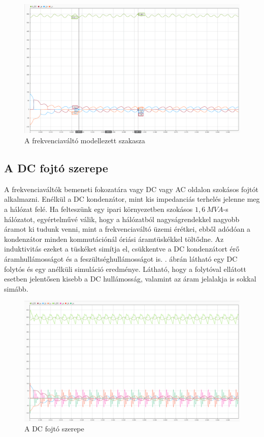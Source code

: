 \begin{figure}[H]
	\centering
	\includegraphics[width = \textwidth]{figures/continous_testrun_1.png}
	\caption{A frekvenciaváltó modellezett szakasza} 
	\label{fig:cont_run}
\end{figure}

\subsection{A DC fojtó szerepe}

A frekvenciaváltók bemeneti fokozatára vagy DC vagy AC oldalon szokásos fojtót alkalmazni. Enélkül a DC kondenzátor, mint kis impedanciás terhelés jelenne meg a hálózat felé. Ha felteszünk egy ipari környezetben szokásos $1,6\ MVA$-s hálózatot, egyértelművé válik, hogy a hálózatból nagyságrendekkel nagyobb áramot ki tudunk venni, mint a frekvenciaváltó üzemi érétkei, ebből adódóan a kondenzátor minden kommutációnál óriási áramtüskékkel töltődne. Az induktivitás ezeket a tüskéket simítja el, csükkentve a DC kondenzátort érő áramhullámosságot és a feszültséghullámosságot is. . ábrán látható egy DC folytós és egy anélküli simuláció eredménye. Látható, hogy a folytóval ellátott esetben jelentősen kisebb a DC hullámosság, valamint az áram jelalakja is sokkal simább.

\begin{figure}[H!]
	\centering
	\includegraphics[width = \textwidth]{figures/choke_vs_nochoke_11A.png}
	\caption{A DC fojtó szerepe} 
	\label{fig:chokenochoke}
\end{figure}



